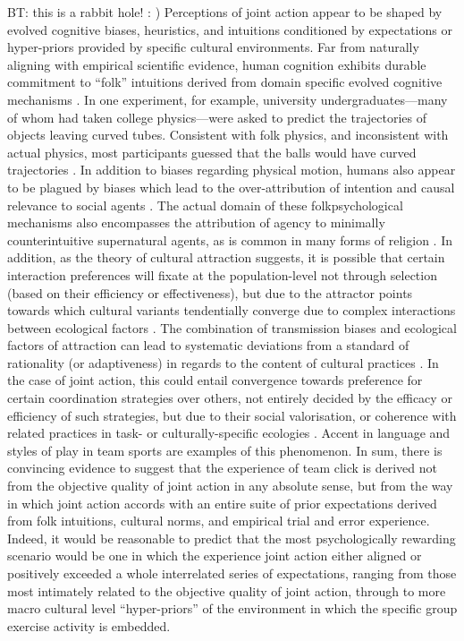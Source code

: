 \begin{CJK}{UTF8}{gbsn}
{BT: this is a rabbit hole! : )
Perceptions of joint action appear to be shaped by evolved cognitive biases, heuristics, and intuitions conditioned by expectations or hyper-priors provided by specific cultural environments.  Far from naturally aligning with empirical scientific evidence, human cognition exhibits durable commitment to ``folk'' intuitions derived from domain specific evolved cognitive mechanisms \citep{Bloom2007}.  In one experiment, for example, university undergraduates–--many of whom had taken college physics---were asked to predict the trajectories of objects leaving curved tubes. Consistent with folk physics, and inconsistent with actual physics, most participants guessed that the balls would have curved trajectories \citep{McCloskey1980}.
In addition to biases regarding physical motion, humans also appear to be plagued by biases which lead to the over-attribution of intention and causal relevance to social agents \citep{Atran2004}.  The actual domain of these folkpsychological mechanisms also encompasses the attribution of agency to minimally counterintuitive supernatural agents, as is common in many forms of religion \citep{Boyer2001}.
In addition, as the theory of cultural attraction suggests, it is possible that certain interaction preferences will fixate at the population-level not through selection (based on their efficiency or effectiveness), but due to the attractor points towards which cultural variants tendentially converge due to complex interactions between ecological factors \citep{Sperber1996,Mesoudi2017}. The combination of transmission biases and ecological factors of attraction can lead to systematic deviations from a standard of rationality (or adaptiveness) in regards to the content of cultural practices \citep{Kahneman2003}.  In the case of joint action, this could entail convergence towards preference for certain coordination strategies over others, not entirely decided by the efficacy or efficiency of such strategies, but due to their social valorisation, or coherence with related practices in task- or culturally-specific ecologies \citep{Claidiere2014}.  Accent in language and styles of play in team sports are examples of this phenomenon.  In sum, there is convincing evidence to suggest that the experience of team click is derived not from the objective quality of joint action in any absolute sense, but from the way in which joint action accords with an entire suite of prior expectations derived from folk intuitions, cultural norms, and empirical trial and error experience.  Indeed, it would be reasonable to predict that the most psychologically rewarding scenario would be one in which the experience joint action either aligned or positively exceeded a whole interrelated series of expectations, ranging from those most intimately related to the objective quality of joint action, through to more macro cultural level ``hyper-priors'' of the environment in which the specific group exercise activity is embedded.

}
\end{CJK}
